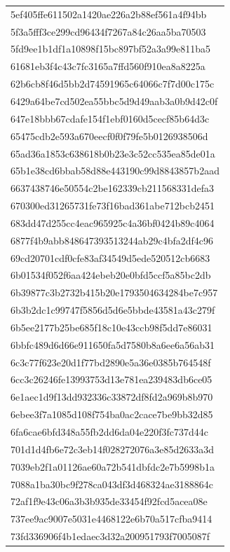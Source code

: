 \begin{tabular}{l}
5ef405ffe611502a1420ae226a2b88ef561a4f94bb \\
5f3a5fff3ce299cd96434f7267a84c26aa5ba70503 \\
5fd9ee1b1df1a10898f15bc897bf52a3a99e811ba5 \\
61681eb3f4c43c7fc3165a7ffd560f910ea8a8225a \\
62b6cb8f46d5bb2d74591965c64066c7f7d00c175c \\
6429a64be7cd502ea55bbc5d9d49aab3a0b9d42c0f \\
647e18bbb67cdafe154f1ebf0160d5cecf85b64d3c \\
65475cdb2e593a670eecf0f0f79fe5b0126938506d \\
65ad36a1853c638618b0b23e3c52cc535ea85de01a \\
65b1e38cd6bbab58d88e443190c99d8843857b2aad \\
6637438746e50554c2be162339cb211568331defa3 \\
670300ed31265731fe73f16bad361abe712bcb2451 \\
683dd47d255cc4eac965925c4a36bf0424b89c4064 \\
6877f4b9abb848647393513244ab29c4bfa2df4c96 \\
69cd20701cdf0cfe83af34549d5ede520512cb6683 \\
6b01534f052f6aa424ebeb20e0bfd5ccf5a85bc2db \\
6b39877c3b2732b415b20e1793504634284be7c957 \\
6b3b2dc1c99747f5856d5d6e5bbde43581a43c279f \\
6b5ee2177b25be685f18c10e43ccb98f5dd7e86031 \\
6bbfc489d6d66e911650fa5d7580b8a6ee6a56ab31 \\
6c3c77f623e20d1f77bd2890e5a36e0385b764548f \\
6cc3c26246fe13993753d13e781ea239483db6ce05 \\
6e1aec1d9f13dd932336c33872df8fd2a969b8b970 \\
6ebee3f7a1085d108f754ba0ac2cace7be9bb32d85 \\
6fa6cae6bfd348a55fb2dd6da04e220f3fc737d44c \\
701d1d4fb6e72c3eb14f028272076a3e85d2633a3d \\
7039eb2f1a01126ae60a72b541dbfdc2e7b5998b1a \\
7088a1ba30bc9f278ca043df3d468324ae3188864c \\
72af1f9e43c06a3b3b935de33454f92fcd5acea08e \\
737ee9ac9007e5031e4468122e6b70a517cfba9414 \\
73fd336906f4b1edaec3d32a200951793f7005087f \\

\end{tabular}
